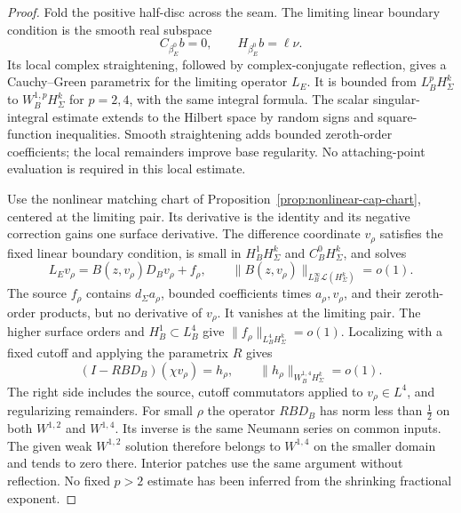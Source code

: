 \documentclass[11pt]{amsart}
\theoremstyle{definition}
\theoremstyle{remark}
\theoremstyle{plain}
\begin{document}
\begin{proof}
Fold the positive half-disc across the seam. The limiting linear
boundary condition is the smooth real subspace
\[
          C_{\beta_E^0}b=0,\qquad H_{\beta_E^0}b=\ell\nu.
\]
Its local complex straightening, followed by complex-conjugate
reflection, gives a Cauchy--Green parametrix for the limiting operator
$L_E$. It is bounded from $L^p_BH^k_\Sigma$ to
$W^{1,p}_BH^k_\Sigma$ for $p=2,4$, with the same integral formula.
The scalar singular-integral estimate extends to the Hilbert space by
random signs and square-function inequalities. Smooth straightening
adds bounded zeroth-order coefficients; the local remainders improve
base regularity. No attaching-point evaluation is required in this
local estimate.

Use the nonlinear matching chart of
Proposition~\ref{prop:nonlinear-cap-chart}, centered at the limiting
pair. Its derivative is the identity and its negative correction gains
one surface derivative. The difference coordinate $v_\rho$ satisfies
the fixed linear boundary condition, is small in $H^1_BH^k_\Sigma$
and $C^0_BH^k_\Sigma$, and solves
\begin{equation}\label{eq:constructed-local-cr}
 L_Ev_\rho=B(z,v_\rho)D_Bv_\rho+f_\rho,\qquad
      \|B(z,v_\rho)\|_{L^\infty_B\mathcal L(H^k_\Sigma)}=o(1).
\end{equation}
The source $f_\rho$ contains $d_\Sigma a_\rho$, bounded coefficients
times $a_\rho,v_\rho$, and their zeroth-order products, but no derivative
of $v_\rho$. It vanishes at the limiting pair. The higher surface
orders and $H^1_B\subset L^4_B$ give $\|f_\rho\|_{L^4_BH^k_\Sigma}=o(1)$.
Localizing with a fixed cutoff and applying the parametrix $R$ gives
\begin{equation}\label{eq:constructed-cr-improvement}
            (I-RBD_B)(\chi v_\rho)=h_\rho,\qquad
                      \|h_\rho\|_{W^{1,4}_BH^k_\Sigma}=o(1).
\end{equation}
The right side includes the source, cutoff commutators applied to
$v_\rho\in L^4$, and regularizing remainders. For small $\rho$ the
operator $RBD_B$ has norm less than $\frac12$ on both $W^{1,2}$ and
$W^{1,4}$. Its inverse is the same Neumann series on common inputs.
The given weak $W^{1,2}$ solution therefore belongs to $W^{1,4}$ on
the smaller domain and tends to zero there. Interior patches use the
same argument without reflection. No fixed $p>2$ estimate has been
inferred from the shrinking fractional exponent.


\end{proof}
\end{document}
